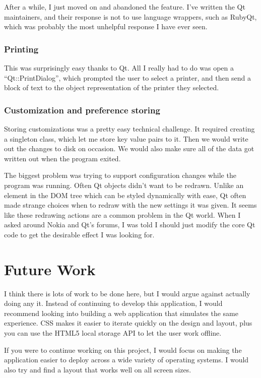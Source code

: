 \documentclass[10pt]{article}
\begin{document}
After a while, I just moved on and abandoned the feature. I've written the Qt maintainers, and their response is not to use language wrappers, such as RubyQt, which was probably the most unhelpful response I have ever seen.

\subsubsection{Printing}

This was surprisingly easy thanks to Qt. All I really had to do was open a ``Qt::PrintDialog'', which prompted the user to select a printer, and then send a block of text to the object representation of the printer they selected.

\subsubsection{Customization and preference storing}

Storing customizations was a pretty easy technical challenge. It required creating a singleton class, which let me store key value pairs to it. Then we would write out the changes to disk on occasion. We would also make sure all of the data got written out when the program exited.

The biggest problem was trying to support configuration changes while the program was running. Often Qt objects didn't want to be redrawn. Unlike an element in the DOM tree which can be styled dynamically with ease, Qt often made strange choices when to redraw with the new settings it was given. It seems like these redrawing actions are a common problem in the Qt world. When I asked around Nokia and Qt's forums, I was told I should just modify the core Qt code to get the desirable effect I was looking for.

\section{Future Work}

I think there is lots of work to be done here, but I would argue against actually doing any it. Instead of continuing to develop this application, I would recommend looking into building a web application that simulates the same experience. CSS makes it easier to iterate quickly on the design and layout, plus you can use the HTML5 local storage API to let the user work offline.

If you were to continue working on this project, I would focus on making the application easier to deploy across a wide variety of operating systems. I would also try and find a layout that works well on all screen sizes.
\end{document}
